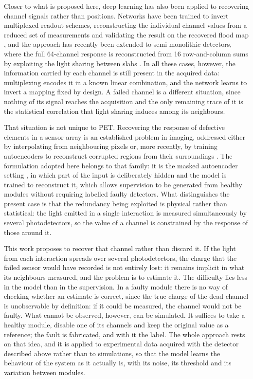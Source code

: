 \documentclass[10pt,conference]{IEEEtran}
\begin{document}
Closer to what is proposed here, deep learning has also been applied to
recovering channel signals rather than positions. Networks have been trained
to invert multiplexed readout schemes, reconstructing the individual channel
values from a reduced set of measurements and validating the result on the
recovered flood map \cite{li2023, niu_cnn-based_2024}, and the approach has
recently been extended to semi-monolithic detectors, where the full
64-channel response is reconstructed from 16 row-and-column sums by
exploiting the light sharing between slabs
\cite{loignon-houle_multi-input_2026}. In all these cases, however, the
information carried by each channel is still present in the acquired data:
multiplexing encodes it in a known linear combination, and the network
learns to invert a mapping fixed by design. A failed channel is a different
situation, since nothing of its signal reaches the acquisition and the only
remaining trace of it is the statistical correlation that light sharing
induces among its neighbours.

That situation is not unique to PET. Recovering the response of defective
elements in a sensor array is an established problem in imaging, addressed
either by interpolating from neighbouring pixels or, more recently, by
training autoencoders to reconstruct corrupted regions from their
surroundings \cite{fixpix2023}. The formulation adopted here belongs to that
family: it is the masked autoencoder setting \cite{he2022mae}, in which part
of the input is deliberately hidden and the model is trained to reconstruct
it, which allows supervision to be generated from healthy modules without
requiring labelled faulty detectors. What distinguishes the present case is
that the redundancy being exploited is physical rather than statistical: the
light emitted in a single interaction is measured simultaneously by several
photodetectors, so the value of a channel is constrained by the response of
those around it.

This work proposes to recover that channel rather than discard it. If the
light from each interaction spreads over several photodetectors, the charge
that the failed sensor would have recorded is not entirely lost: it remains
implicit in what its neighbours measured, and the problem is to estimate it.
The difficulty lies less in the model than in the supervision. In a faulty
module there is no way of checking whether an estimate is correct, since the
true charge of the dead channel is unobservable by definition: if it could
be measured, the channel would not be faulty. What cannot be observed,
however, can be simulated. It suffices to take a healthy module, disable one
of its channels and keep the original value as a reference; the fault is
fabricated, and with it the label. The whole approach rests on that idea,
and it is applied to experimental data acquired with the detector described
above rather than to simulations, so that the model learns the behaviour of
the system as it actually is, with its noise, its threshold and its
variation between modules.
\end{document}
